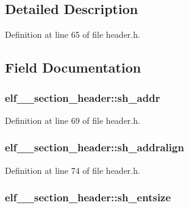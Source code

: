 \subsection{Detailed Description}


Definition at line 65 of file header.h.



\subsection{Field Documentation}
\hypertarget{structelf__32__section__header_a39df760c684f21d4e3112988f5576b9f}{
\subsubsection[{sh\_\-addr}]{ {\bf elf\_\_\-section\_\-header::sh\_\-addr}}}
\label{structelf__32__section__header_a39df760c684f21d4e3112988f5576b9f}


Definition at line 69 of file header.h.

\hypertarget{structelf__32__section__header_a6f0e976649e646aa6b9ebbf041602685}{
\subsubsection[{sh\_\-addralign}]{ {\bf elf\_\_\-section\_\-header::sh\_\-addralign}}}
\label{structelf__32__section__header_a6f0e976649e646aa6b9ebbf041602685}


Definition at line 74 of file header.h.

\hypertarget{structelf__32__section__header_abea1c9ab55479738b3d4293d5c983a01}{
\subsubsection[{sh\_\-entsize}]{ {\bf elf\_\_\-section\_\-header::sh\_\-entsize}}}
\label{structelf__32__section__header_abea1c9ab55479738b3d4293d5c983a01}


